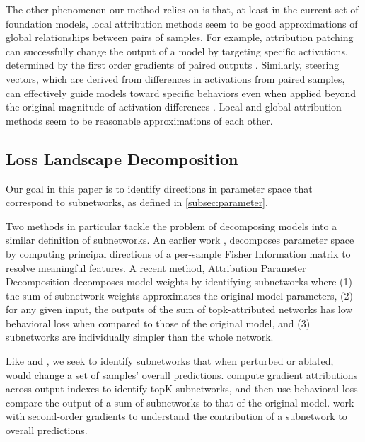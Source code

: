 \documentclass{article}
\theoremstyle{plain}
\theoremstyle{definition}
\theoremstyle{remark}
\begin{document}
The other phenomenon our method relies on is that, at least in the current set of foundation models, local attribution methods seem to be good approximations of global relationships between pairs of samples. For example, attribution patching can successfully change the output of a model by targeting specific activations, determined by the first order gradients of paired outputs \cite{nanda2023attribution,kramar2024atp,syed2023attribution}. Similarly, steering vectors, which are derived from differences in activations from paired samples, can effectively guide models toward specific behaviors even when applied beyond the original magnitude of activation differences \cite{turner2023steering,subramani2022extracting}. Local and global attribution methods seem to be reasonable approximations of each other.

\subsection{Loss Landscape Decomposition}\label{subsec:loss_landscape_decomp}

Our goal in this paper is to identify directions in parameter space that correspond to subnetworks, as defined in \ref{subsec:parameter}.

Two methods in particular tackle the problem of decomposing models into a similar definition of subnetworks. An earlier work \cite{matena2023npeff},  decomposes parameter space by computing principal directions of a per-sample Fisher Information matrix to resolve meaningful features.  A recent method, Attribution Parameter Decomposition  \cite{braun2025interpretability} decomposes model weights by identifying subnetworks where (1) the sum of subnetwork weights approximates the original model parameters, (2) for any given input, the outputs of the sum of topk-attributed networks has low behavioral loss when compared to those of the original model, and (3) subnetworks are individually simpler than the whole network.  

Like \cite{braun2025interpretability} and \cite{matena2023npeff}, we seek to identify subnetworks that when perturbed or ablated, would change a set of samples' overall predictions. \cite{braun2025interpretability} compute gradient attributions across output indexes to identify topK subnetworks, and then use behavioral loss compare the output of a sum of subnetworks to that of the original model. \cite{matena2023npeff} work with second-order gradients to understand the contribution of a subnetwork to overall predictions. 
\end{document}
